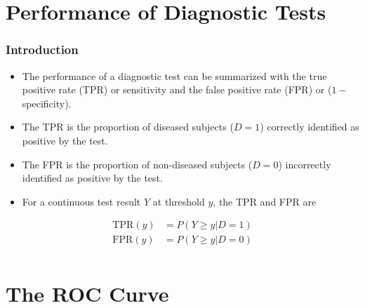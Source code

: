 \documentclass[t]{beamer}
\begin{document}
\section{Performance of Diagnostic Tests}

\begin{frame}
\frametitle{Introduction}
\begin{itemize}
	\item The performance of a diagnostic test can be summarized with the true positive rate (TPR) or sensitivity and the false positive rate (FPR) or ($1 -$ specificity).
	\item The TPR is the proportion of diseased subjects ($D = 1$) correctly identified as positive by the test.
	\item The FPR is the proportion of non-diseased subjects ($D = 0$) incorrectly identified as positive by the test.
	\item For a continuous test result $Y$ at threshold $y$, the TPR and FPR are
\end{itemize}
\begin{align*}
	\text{TPR}(y) &= P(Y \geq y| D = 1) \\
	\text{FPR}(y) &= P(Y \geq y| D = 0) \\
\end{align*}
\end{frame}

\section{The ROC Curve}
\end{document}
